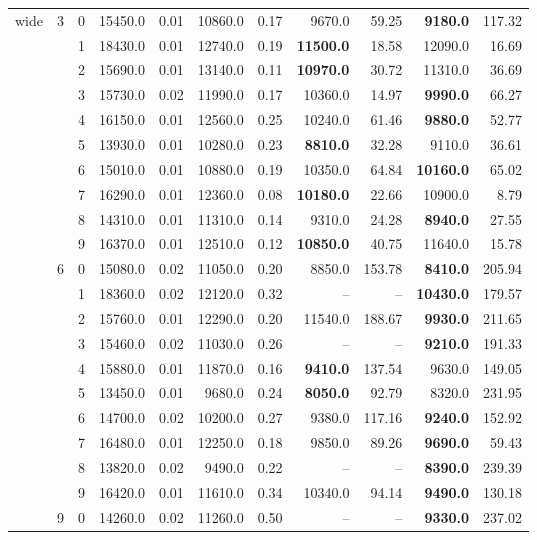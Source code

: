 {\begin{longtable}{ccc|rr|rr|rr|rr}
wide & 3 & 0 & 15450.0 & 0.01 & 10860.0 & 0.17 & 9670.0 & 59.25 & \textbf{9180.0} & 117.32 \\
 &  & 1 & 18430.0 & 0.01 & 12740.0 & 0.19 & \textbf{11500.0} & 18.58 & 12090.0 & 16.69 \\
 &  & 2 & 15690.0 & 0.01 & 13140.0 & 0.11 & \textbf{10970.0} & 30.72 & 11310.0 & 36.69 \\
 &  & 3 & 15730.0 & 0.02 & 11990.0 & 0.17 & 10360.0 & 14.97 & \textbf{9990.0} & 66.27 \\
 &  & 4 & 16150.0 & 0.01 & 12560.0 & 0.25 & 10240.0 & 61.46 & \textbf{9880.0} & 52.77 \\
 &  & 5 & 13930.0 & 0.01 & 10280.0 & 0.23 & \textbf{8810.0} & 32.28 & 9110.0 & 36.61 \\
 &  & 6 & 15010.0 & 0.01 & 10880.0 & 0.19 & 10350.0 & 64.84 & \textbf{10160.0} & 65.02 \\
 &  & 7 & 16290.0 & 0.01 & 12360.0 & 0.08 & \textbf{10180.0} & 22.66 & 10900.0 & 8.79 \\
 &  & 8 & 14310.0 & 0.01 & 11310.0 & 0.14 & 9310.0 & 24.28 & \textbf{8940.0} & 27.55 \\
 &  & 9 & 16370.0 & 0.01 & 12510.0 & 0.12 & \textbf{10850.0} & 40.75 & 11640.0 & 15.78 \\ \hline
 & 6 & 0 & 15080.0 & 0.02 & 11050.0 & 0.20 & 8850.0 & 153.78 & \textbf{8410.0} & 205.94 \\
 &  & 1 & 18360.0 & 0.02 & 12120.0 & 0.32 & -- & -- & \textbf{10430.0} & 179.57 \\
 &  & 2 & 15760.0 & 0.01 & 12290.0 & 0.20 & 11540.0 & 188.67 & \textbf{9930.0} & 211.65 \\
 &  & 3 & 15460.0 & 0.02 & 11030.0 & 0.26 & -- & -- & \textbf{9210.0} & 191.33 \\
 &  & 4 & 15880.0 & 0.01 & 11870.0 & 0.16 & \textbf{9410.0} & 137.54 & 9630.0 & 149.05 \\
 &  & 5 & 13450.0 & 0.01 & 9680.0 & 0.24 & \textbf{8050.0} & 92.79 & 8320.0 & 231.95 \\
 &  & 6 & 14700.0 & 0.02 & 10200.0 & 0.27 & 9380.0 & 117.16 & \textbf{9240.0} & 152.92 \\
 &  & 7 & 16480.0 & 0.01 & 12250.0 & 0.18 & 9850.0 & 89.26 & \textbf{9690.0} & 59.43 \\
 &  & 8 & 13820.0 & 0.02 & 9490.0 & 0.22 & -- & -- & \textbf{8390.0} & 239.39 \\
 &  & 9 & 16420.0 & 0.01 & 11610.0 & 0.34 & 10340.0 & 94.14 & \textbf{9490.0} & 130.18 \\ \hline
 & 9 & 0 & 14260.0 & 0.02 & 11260.0 & 0.50 & -- & -- & \textbf{9330.0} & 237.02 \\

\end{longtable}}
